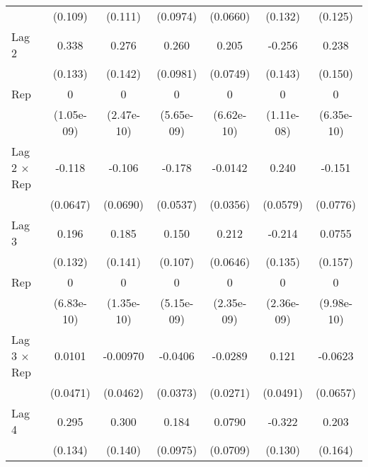\begin{table}[htbp]
\begin{tabular}{l*{6}{c}}
                &  (0.109)         &  (0.111)         & (0.0974)         & (0.0660)         &  (0.132)         &  (0.125)         \\
\addlinespace
Lag 2           &    0.338\sym{*}  &    0.276         &    0.260\sym{**} &    0.205\sym{**} &   -0.256         &    0.238         \\
                &  (0.133)         &  (0.142)         & (0.0981)         & (0.0749)         &  (0.143)         &  (0.150)         \\
\addlinespace
Rep             &        0         &        0         &        0         &        0         &        0         &        0         \\
                &(1.05e-09)         &(2.47e-10)         &(5.65e-09)         &(6.62e-10)         &(1.11e-08)         &(6.35e-10)         \\
\addlinespace
Lag 2 $\times$ Rep&   -0.118         &   -0.106         &   -0.178\sym{***}&  -0.0142         &    0.240\sym{***}&   -0.151         \\
                & (0.0647)         & (0.0690)         & (0.0537)         & (0.0356)         & (0.0579)         & (0.0776)         \\
\addlinespace
Lag 3           &    0.196         &    0.185         &    0.150         &    0.212\sym{**} &   -0.214         &   0.0755         \\
                &  (0.132)         &  (0.141)         &  (0.107)         & (0.0646)         &  (0.135)         &  (0.157)         \\
\addlinespace
Rep             &        0         &        0         &        0         &        0         &        0         &        0         \\
                &(6.83e-10)         &(1.35e-10)         &(5.15e-09)         &(2.35e-09)         &(2.36e-09)         &(9.98e-10)         \\
\addlinespace
Lag 3 $\times$ Rep&   0.0101         & -0.00970         &  -0.0406         &  -0.0289         &    0.121\sym{*}  &  -0.0623         \\
                & (0.0471)         & (0.0462)         & (0.0373)         & (0.0271)         & (0.0491)         & (0.0657)         \\
\addlinespace
Lag 4           &    0.295\sym{*}  &    0.300\sym{*}  &    0.184         &   0.0790         &   -0.322\sym{*}  &    0.203         \\
                &  (0.134)         &  (0.140)         & (0.0975)         & (0.0709)         &  (0.130)         &  (0.164)         \\

\end{tabular}
\end{table}

